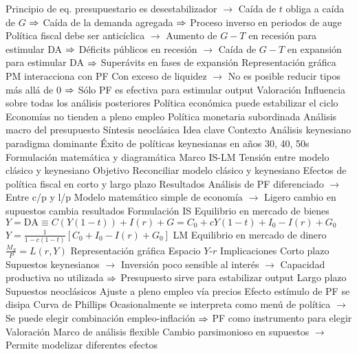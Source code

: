 \documentclass{nuevotema}
\begin{document}
\begin{esquemal}
				\4[] Principio de eq. presupuestario es desestabilizador
				\4[] $\to$ Caída de $t$ obliga a caída de $G$
				\4[] $\Rightarrow$ Caída de la demanda agregada
				\4[] $\Rightarrow$ Proceso inverso en periodos de auge
				\4[] Política fiscal debe ser anticíclica
				\4[] $\to$ Aumento de $G-T$ en recesión para estimular DA
				\4[] $\Rightarrow$ Déficits públicos en recesión
				\4[] $\to$ Caída de $G-T$ en expansión para estimular DA
				\4[] $\Rightarrow$ Superávits en fases de expansión
				\4 Representación gráfica
				\4[] 
				\4 PM interacciona con PF
				\4[] Con exceso de liquidez
				\4[] $\to$ No es posible reducir tipos más allá de 0
				\4[] $\Rightarrow$ Sólo PF es efectiva para estimular output
			\3 Valoración
				\4 Influencia sobre todas los análisis posteriores
				\4 Política económica puede estabilizar el ciclo
				\4 Economías no tienden a pleno empleo
				\4 Política monetaria subordinada
				\4 Análisis macro del presupuesto
		\2 Síntesis neoclásica
			\3 Idea clave
				\4 Contexto
				\4[] Análisis keynesiano paradigma dominante
				\4[] Éxito de políticas keynesianas en años 30, 40, 50s
				\4[] Formulación matemática y diagramática
				\4[] Marco IS-LM
				\4[] Tensión entre modelo clásico y keynesiano
				\4 Objetivo
				\4[] Reconciliar modelo clásico y keynesiano
				\4[] Efectos de política fiscal en corto y largo plazo
				\4 Resultados
				\4[] Análisis de PF diferenciado
				\4[] $\to$ Entre c/p y l/p
				\4[] Modelo matemático simple de economía
				\4[] $\to$ Ligero cambio en supuestos cambia resultados
			\3 Formulación
				\4 IS
				\4[] Equilibrio en mercado de bienes
				\4[] $Y= \text{DA} \equiv C(Y(1-t)) + I(r) + G = C_0 + cY(1-t) + I_0 - I(r) + G_0$
				\4[] $Y = \frac{1}{1-c(1-t)} \left[ C_0 + I_0 - I(r) + G_0 \right]$
				\4 LM
				\4[] Equilibrio en mercado de dinero
				\4[] $\frac{M_S}{P} = L(r,Y)$
				\4 Representación gráfica
				\4[] Espacio $Y$-$r$
			\3 Implicaciones
				\4 Corto plazo
				\4[] Supuestos keynesianos
				\4[] $\to$ Inversión poco sensible al interés
				\4[] $\to$ Capacidad productiva no utilizada
				\4[] $\Rightarrow$ Presupuesto sirve para estabilizar output
				\4 Largo plazo
				\4[] Supuestos neoclásicos
				\4[] Ajuste a pleno empleo vía precios
				\4[] Efecto estímulo de PF se disipa
				\4 Curva de Phillips
				\4[] Ocasionalmente se interpreta como menú de política
				\4[] $\to$ Se puede elegir combinación empleo-inflación
				\4[] $\Rightarrow$ PF como instrumento para elegir
			\3 Valoración
				\4 Marco de análisis flexible
				\4[] Cambio parsimonioso en supuestos
				\4[] $\to$ Permite modelizar diferentes efectos

\end{esquemal}
\end{document}
